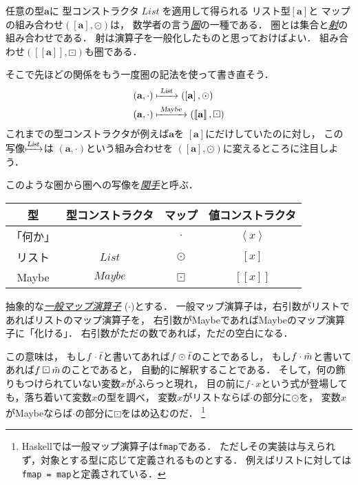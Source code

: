 \documentclass[a5paper,draft]{jsbook}
\def\[{\left[\!\left[}
\def\]{\right]\!\right]}
\newcommand{\programminglanguage}[1]{\textsf{#1}}
\newcommand{\haskell}{\programminglanguage{Haskell}}
\newcommand{\keyword}[1]{{\underline{\emph{#1}}}}
\newcommand{\code}[1]{\texttt{#1}}
\newcommand{\mathTypeParameter}[1]{\mathbf{#1}}
\newcommand{\mathFunctor}[1]{\textsl{#1}} %
\newcommand{\mathTypeConstructor}[1]{\mathit{#1}} %
\newcommand{\mathListVar}[1]{\Bar{#1}}
\newcommand{\mathMaybeVar}[1]{\Tilde{#1}}
\newcommand{\mathListWith}[1]{\left[#1\right]}
\newcommand{\mathTupleWith}[1]{\left(#1\right)}
\newcommand{\mathMaybeWith}[1]{\[#1\]}
\newcommand{\mathPureWith}[1]{\left\langle#1\right\rangle}
\newcommand{\mathListType}[1]{\left[#1\right]}
\newcommand{\mathMaybeType}[1]{\[#1\]}
\DeclareMathOperator{\mathList}{\mathTypeConstructor{List}}
\DeclareMathOperator{\mathMaybe}{\mathTypeConstructor{Maybe}}
\DeclareMathOperator{\mathListFunctor}{\mathFunctor{List}}
\DeclareMathOperator{\mathMaybeFunctor}{\mathFunctor{Maybe}}
\newcommand{\mathGeneralMap}{\mathbin{\cdot}}
\newcommand{\mathMap}{\mathbin{\odot}}
\newcommand{\mathMaybeMap}{\mathbin{\boxdot}}
\begin{document}
任意の型$\mathTypeParameter{a}$に
型コンストラクタ$\mathList$を適用して得られる
リスト型$\mathListType{\mathTypeParameter{a}}$と
マップの組み合わせ$\mathTupleWith{\mathListType{\mathTypeParameter{a}},\mathMap}$は，
数学者の言う\keyword{圏}の一種である．
圏とは集合と\keyword{射}の組み合わせである．
射は演算子を一般化したものと思っておけばよい．
組み合わせ$\mathTupleWith{\mathMaybeType{\mathTypeParameter{a}},\mathMaybeMap}$も圏である．

そこで先ほどの関係をもう一度圏の記法を使って書き直そう．
\begin{align}
\mathTupleWith{\mathTypeParameter{a},\mathGeneralMap}
&\xmapsto{\;\mathListFunctor\;}\mathTupleWith{\mathListType{\mathTypeParameter{a}},\mathMap}\\
\mathTupleWith{\mathTypeParameter{a},\mathGeneralMap}
&\xmapsto{\;\mathMaybeFunctor\;}\mathTupleWith{\mathMaybeType{\mathTypeParameter{a}},\mathMaybeMap}
\end{align}
これまでの型コンストラクタが例えば$\mathTypeParameter{a}$を
$\mathListType{\mathTypeParameter{a}}$にだけしていたのに対し，
この写像$\xmapsto{\mathListFunctor}$は
$\mathTupleWith{\mathTypeParameter{a},\mathGeneralMap}$という組み合わせを
$\mathTupleWith{\mathListType{\mathTypeParameter{a}},\mathMap}$に変えるところに注目しよう．

このような圏から圏への写像を\keyword{関手}と呼ぶ．

\begin{table}
\begin{center}
\begin{tabular}{||c|c|c|c||}\hline
型&型コンストラクタ&マップ&値コンストラクタ\\\hline\hline
「何か」&&$\mathGeneralMap$&$\mathPureWith{x}$\\
リスト&$\mathList$&$\mathMap$&$\mathListWith{x}$\\
Maybe&$\mathMaybe$&$\mathMaybeMap$&$\mathMaybeWith{x}$\\\hline
\end{tabular}
\end{center}
\end{table}



抽象的な\keyword{一般マップ演算子} ($\mathGeneralMap$)とする．
一般マップ演算子は，右引数がリストであればリストのマップ演算子を，
右引数がMaybeであればMaybeのマップ演算子に「化ける」．
右引数がただの数であれば，ただの空白になる．

この意味は，
もし$f\mathGeneralMap\mathListVar{t}$と書いてあれば$f\mathMap\mathListVar{t}$のことであるし，
もし$f\mathGeneralMap\mathMaybeVar{m}$と書いてあれば$f\mathMaybeMap\mathMaybeVar{m}$のことであると，
自動的に解釈することである．
そして，何の飾りもつけられていない変数$x$がふらっと現れ，
目の前に$f\mathGeneralMap x$という式が登場しても，落ち着いて変数$x$の型を調べ，
変数$x$がリストならば$\mathGeneralMap$の部分に$\mathMap$を，
変数$x$がMaybeならば$\mathGeneralMap$の部分に$\mathMaybeMap$をはめ込むのだ．%
\footnote{\haskell では一般マップ演算子は\code{fmap}である．
ただしその実装は与えられず，対象とする型に応じて定義されるものとする．
例えばリストに対しては\code{fmap = map}と定義されている．}
\end{document}
